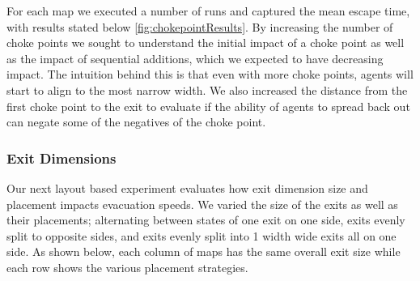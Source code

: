 \documentclass[12pt,letterpaper]{article}
\begin{document}
For each map we executed a number of runs and captured the mean escape time, with results stated below \ref{fig:chokepointResults}.  By increasing the number of choke points we sought to understand the initial impact of a choke point as well as the impact of sequential additions, which we expected to have decreasing impact. The intuition behind this is that even with more choke points, agents will start to align to the most narrow width.  We also increased the distance from the first choke point to the exit to evaluate if the ability of agents to spread back out can negate some of the negatives of the choke point.  

\subsubsection{Exit Dimensions} \label{exitdims}

Our next layout based experiment evaluates how exit dimension size and placement impacts evacuation speeds.  We varied the size of the exits as well as their placements; alternating between states of one exit on one side, exits evenly split to opposite sides, and exits evenly split into 1 width wide exits all on one side.  As shown below, each column of maps has the same overall exit size while each row shows the various placement strategies.
\end{document}

